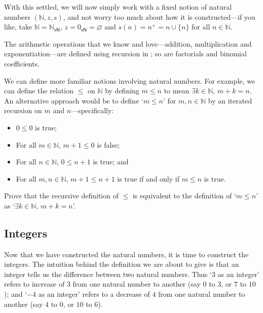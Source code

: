 With this settled, we will now simply work with a fixed notion of natural numbers $(\mathbb{N}, z, s)$, and not worry too much about how it is constructed---if you like, take $\mathbb{N} = \mathbb{N}_{\mathsf{vN}}$, $z = 0_{\mathsf{vN}} = \varnothing$ and $s(n) = n^+ = n \cup \{ n \}$ for all $n \in \mathbb{N}$.

The arithmetic operations that we know and love---addition, multiplication and exponentiation---are defined using recursion in ; so are factorials and binomial coefficients.

We can define more familiar notions involving natural numbers. For example, we can define the relation $\le$ on $\mathbb{N}$ by defining $m \le n$ to mean $\exists k \in \mathbb{N},\, m+k=n$. An alternative approach would be to define `$m \le n$' for $m,n \in \mathbb{N}$ by an iterated recursion on $m$ and $n$---specifically:
\begin{itemize}
\item $0 \le 0$ is true;
\item For all $m \in \mathbb{N}$, $m+1 \le 0$ is false;
\item For all $n \in \mathbb{N}$, $0 \le n+1$ is true; and
\item For all $m,n \in \mathbb{N}$, $m+1 \le n+1$ is true if and only if $m \le n$ is true.
\end{itemize}

\begin{exercise}
Prove that the recursive definition of $\le$ is equivalent to the definition of `$m \le n$' as `$\exists k \in \mathbb{N},\, m+k=n$'.
\end{exercise}

\subsection*{Integers}

Now that we have constructed the natural numbers, it is time to construct the integers. The intuition behind the definition we are about to give is that an integer tells us the difference between two natural numbers. Thus `$3$ as an integer' refers to increase of $3$ from one natural number to another (say $0$ to $3$, or $7$ to $10$); and `$-4$ as an integer' refers to a decrease of $4$ from one natural number to another (say $4$ to $0$, or $10$ to $6$).

